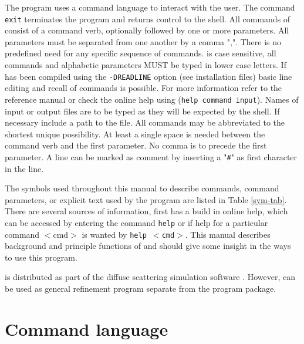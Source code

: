 The program uses a command language to interact with the user.  The
command {\tt exit} terminates the program and returns control to the
shell.  All commands of \Diffev consist of a command verb,
optionally followed by one or more parameters.  All parameters must
be separated from one another by a comma ",".  There is no
predefined need for any specific sequence of commands.  \Diffev     
is case sensitive, all commands and alphabetic parameters MUST be
typed in lower case letters.  If \Diffev has been compiled
using the {\tt -DREADLINE} option (see installation files) basic
line editing and recall of commands is possible.  For more
information refer to the reference manual or check the online help
using ({\tt help command input}).  Names of input or output files
are to be typed as they will be expected by the shell.  If necessary
include a path to the file.  All commands may be abbreviated to the
shortest unique possibility. At least a single space is needed
between the command verb and the first parameter.  No comma is to
precede the first parameter. A line can be marked as comment by
inserting a "{\tt \#}" as first character in the line.\par

The symbols used throughout this manual to describe commands,
command parameters, or explicit text used by the program \Diffev     
are listed in Table \ref{sym-tab}. There are several sources
of information, first \Diffev  has a build in online help, which
can be accessed by entering the command {\tt help} or if help for a
particular command $<$cmd$>$ is wanted by {\tt help $<$cmd$>$}. This
manual describes background and principle functions of \Diffev
and should give some insight in the ways to use this program. \par

\Diffev is distributed as part of the diffuse scattering
simulation software \discus.  However, \Diffev can be used
as general refinement program separate from the \Discus program
package. 


\section{Command language}

